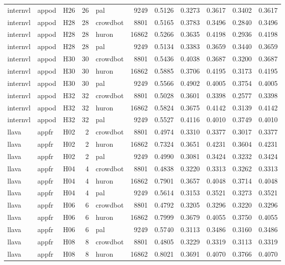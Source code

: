\begin{table}[tbp]
\begin{tabular}{lllrlrrrrrr}
internvl & appod & H26 & 26 & pal & 9249 & 0.5126 & 0.3273 & 0.3617 & 0.3402 & 0.3617 \\
internvl & appod & H28 & 28 & crowdbot & 8801 & 0.5165 & 0.3783 & 0.3496 & 0.2840 & 0.3496 \\
internvl & appod & H28 & 28 & huron & 16862 & 0.5266 & 0.3635 & 0.4198 & 0.2936 & 0.4198 \\
internvl & appod & H28 & 28 & pal & 9249 & 0.5134 & 0.3383 & 0.3659 & 0.3440 & 0.3659 \\
internvl & appod & H30 & 30 & crowdbot & 8801 & 0.5436 & 0.4038 & 0.3687 & 0.3200 & 0.3687 \\
internvl & appod & H30 & 30 & huron & 16862 & 0.5885 & 0.3706 & 0.4195 & 0.3173 & 0.4195 \\
internvl & appod & H30 & 30 & pal & 9249 & 0.5566 & 0.4902 & 0.4005 & 0.3754 & 0.4005 \\
internvl & appod & H32 & 32 & crowdbot & 8801 & 0.5028 & 0.3601 & 0.3398 & 0.2577 & 0.3398 \\
internvl & appod & H32 & 32 & huron & 16862 & 0.5824 & 0.3675 & 0.4142 & 0.3139 & 0.4142 \\
internvl & appod & H32 & 32 & pal & 9249 & 0.5527 & 0.4116 & 0.4010 & 0.3749 & 0.4010 \\
llava & appfr & H02 & 2 & crowdbot & 8801 & 0.4974 & 0.3310 & 0.3377 & 0.3017 & 0.3377 \\
llava & appfr & H02 & 2 & huron & 16862 & 0.7324 & 0.3651 & 0.4231 & 0.3604 & 0.4231 \\
llava & appfr & H02 & 2 & pal & 9249 & 0.4990 & 0.3081 & 0.3424 & 0.3232 & 0.3424 \\
llava & appfr & H04 & 4 & crowdbot & 8801 & 0.4838 & 0.3220 & 0.3313 & 0.3262 & 0.3313 \\
llava & appfr & H04 & 4 & huron & 16862 & 0.7901 & 0.3657 & 0.4048 & 0.3714 & 0.4048 \\
llava & appfr & H04 & 4 & pal & 9249 & 0.5614 & 0.3153 & 0.3521 & 0.3273 & 0.3521 \\
llava & appfr & H06 & 6 & crowdbot & 8801 & 0.4792 & 0.3205 & 0.3296 & 0.3220 & 0.3296 \\
llava & appfr & H06 & 6 & huron & 16862 & 0.7999 & 0.3679 & 0.4055 & 0.3750 & 0.4055 \\
llava & appfr & H06 & 6 & pal & 9249 & 0.5740 & 0.3113 & 0.3486 & 0.3160 & 0.3486 \\
llava & appfr & H08 & 8 & crowdbot & 8801 & 0.4805 & 0.3229 & 0.3319 & 0.3113 & 0.3319 \\
llava & appfr & H08 & 8 & huron & 16862 & 0.8021 & 0.3691 & 0.4070 & 0.3766 & 0.4070 \\

\end{tabular}
\end{table}
